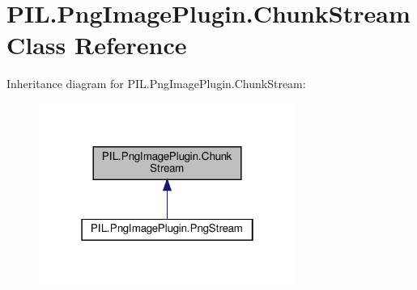 \hypertarget{classPIL_1_1PngImagePlugin_1_1ChunkStream}{}\section{P\+I\+L.\+Png\+Image\+Plugin.\+Chunk\+Stream Class Reference}
\label{classPIL_1_1PngImagePlugin_1_1ChunkStream}


Inheritance diagram for P\+I\+L.\+Png\+Image\+Plugin.\+Chunk\+Stream\+:
\nopagebreak
\begin{figure}[H]
\begin{center}
\leavevmode
\includegraphics[width=238pt]{classPIL_1_1PngImagePlugin_1_1ChunkStream__inherit__graph}
\end{center}
\end{figure}
